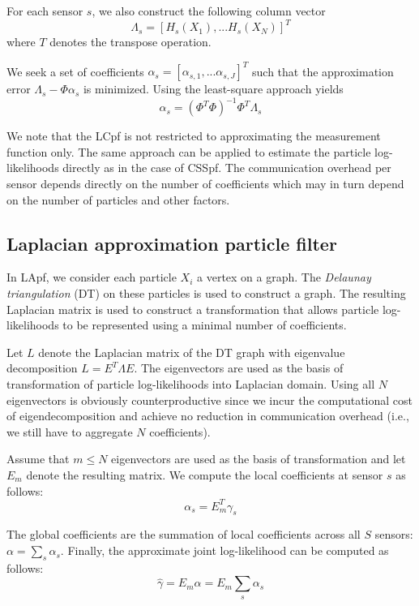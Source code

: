 \documentclass[10pt,letterpaper,final]{article}
\begin{document}
For each sensor $s$, we also construct the following column vector
\begin{equation}
\Lambda_s = [ H_s(X_1), ... H_s(X_N)  ]^T
\label{eqn:lambda_vector}
\end{equation}
where $T$ denotes the transpose operation. 

We seek a set of coefficients $\alpha_s = [\alpha_{s,1},...\alpha_{s,J}]^T$ such that the approximation error $\Lambda_s - \Phi \alpha_s$ is minimized. Using the least-square approach yields
\begin{equation}
\alpha_s = (\Phi^T\Phi)^{-1}\Phi^T\Lambda_s
\end{equation}

We note that the LCpf is not restricted to approximating the measurement function only. The same approach can be applied to estimate the particle log-likelihoods directly as in the case of CSSpf. The communication overhead per sensor depends directly on the number of coefficients which may in turn depend on the number of particles and other factors.

\subsection{Laplacian approximation particle filter}
In LApf, we consider each particle $X_i$ a vertex on a graph. The \textit{Delaunay triangulation} (DT) on these particles is used to construct a graph. The resulting Laplacian matrix is used to construct a transformation that allows particle log-likelihoods to be represented using a minimal number of coefficients. 

Let $L$ denote the Laplacian matrix of the DT graph with eigenvalue decomposition $L=E^T\Lambda E$. The eigenvectors are used as the basis of transformation of particle log-likelihoods into Laplacian domain. Using all $N$ eigenvectors is obviously counterproductive since we incur the computational cost of eigendecomposition and achieve no reduction in communication overhead (i.e., we still have to aggregate $N$ coefficients). 

Assume that $m\leq N$ eigenvectors are used as the basis of transformation and let $E_m$ denote the resulting matrix. We compute the local coefficients at sensor $s$ as follows:
\begin{equation}
\alpha_s = E_m^T\gamma_s
\end{equation}

The global coefficients are the summation of local coefficients across all $S$ sensors: $\alpha = \sum_s \alpha_s$. Finally, the approximate joint log-likelihood can be computed as follows:
\begin{equation}
\hat{\gamma} = E_m\alpha = E_m \sum_s \alpha_s
\end{equation}
\end{document}
